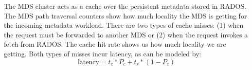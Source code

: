 The MDS cluster acts as a cache over the persistent metadata stored in RADOS. The MDS path traversal counters show how much locality the MDS is getting for the incoming metadata workload. There are two types of cache misses: (1) when the request must be forwarded to another MDS or (2) when the request invokes a fetch from RADOS. The cache hit rate shows us how much locality we are getting. Both types of misses incur latency, as can be modeled by:
\[\text{latency} = t_c * P_c + t_r * (1 - P_c)\] 


